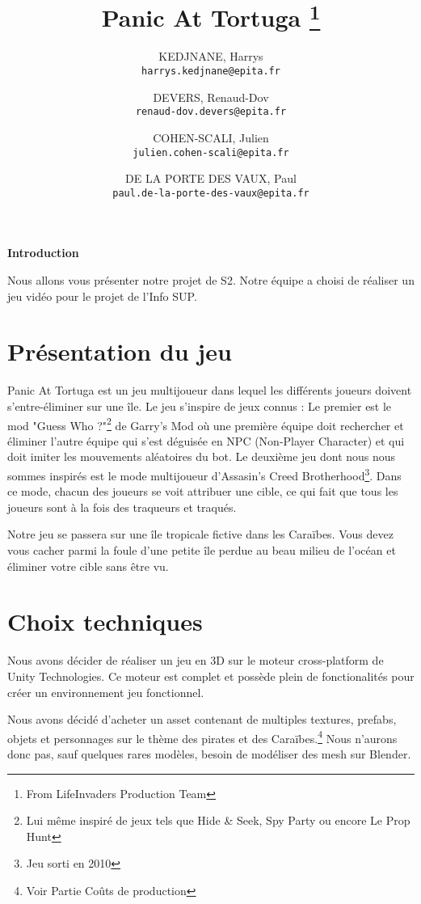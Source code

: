 \documentclass[12pt, letterpaper, twoside]{article}
\title{Panic At Tortuga \thanks{From LifeInvaders Production Team}}
\author{
    KEDJNANE, Harrys\\
    \texttt{harrys.kedjnane@epita.fr}
    \and
    DEVERS, Renaud-Dov\\
    \texttt{renaud-dov.devers@epita.fr}
    \and
    COHEN-SCALI, Julien\\
    \texttt{julien.cohen-scali@epita.fr}
    \and
    DE LA PORTE DES VAUX, Paul\\
    \texttt{paul.de-la-porte-des-vaux@epita.fr}
    
}
\begin{document}
\begin{titlepage}
\maketitle
\end{titlepage}

\begin{center}
    \textbf{Introduction}

    Nous allons vous présenter notre projet de S2.
    Notre équipe a choisi de réaliser un jeu vidéo pour le projet de l'Info SUP.
\end{center}

\tableofcontents
\newpage


\section{Présentation du jeu}
\begin{flushleft}
Panic At Tortuga est un jeu multijoueur dans lequel les différents joueurs doivent s'entre-éliminer sur une île.
Le jeu s'inspire de jeux connus : Le premier est le mod "Guess Who ?"\footnote{Lui même inspiré de jeux tels que Hide \& Seek, Spy Party ou encore Le Prop Hunt} de Garry's Mod
    où une première équipe doit rechercher et éliminer l'autre équipe qui s'est déguisée en NPC (Non-Player Character) et qui doit imiter les mouvements aléatoires du bot.
Le deuxième jeu dont nous nous sommes inspirés est le mode multijoueur d'Assasin's Creed Brotherhood\footnote{Jeu sorti en 2010}.
Dans ce mode, chacun des joueurs se voit attribuer une cible, ce qui fait que tous les joueurs sont à la fois des traqueurs et traqués.

Notre jeu se passera sur une île tropicale fictive dans les Caraïbes.
Vous devez vous cacher parmi la foule d'une petite île perdue au beau milieu de l'océan et éliminer votre cible sans être vu.
\end{flushleft}

\section{Choix techniques}

Nous avons décider de réaliser un jeu en 3D sur le moteur cross-platform de Unity Technologies.
Ce moteur est complet et possède plein de fonctionalités pour créer un environnement jeu fonctionnel.

Nous avons décidé d'acheter un asset contenant de multiples textures, prefabs, objets et personnages sur le thème des pirates et des Caraïbes.\footnote{Voir Partie Coûts de production}
Nous n'aurons donc pas, sauf quelques rares modèles, besoin de modéliser des mesh sur Blender.
\end{document}

